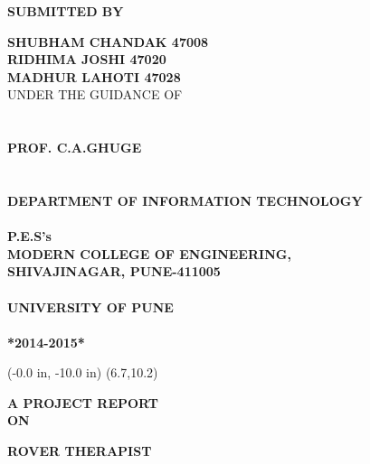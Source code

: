 \documentclass[12pt,a4paper]{article}
\begin{document}
	\begin{center}
	   \textbf{SUBMITTED BY}
	\end{center}
	\vspace{0.1 in}
	\begin{center}
	\textbf{SHUBHAM CHANDAK  47008}\\
	\textbf{RIDHIMA JOSHI  47020}\\	
	\textbf{MADHUR LAHOTI  47028}\\
	
	 \vspace{0.2 in}
	    UNDER THE GUIDANCE OF \\
	    \\
	    \\
	    \textbf{PROF. C.A.GHUGE}\\
	    \\
	    \\
	    \textbf{DEPARTMENT OF INFORMATION TECHNOLOGY}\\
	    \\
	    \textbf{P.E.S's}\\
	    \textbf{MODERN COLLEGE OF ENGINEERING,}\\
	    \textbf{SHIVAJINAGAR, PUNE-411005}\\
	    \\
	    \textbf{UNIVERSITY OF PUNE}\\
	    \\
	    \textbf{*2014-2015*}\\
	     \end{center}

\newpage
\pagestyle{empty}
	\thisfancyput(-0.0 in, -10.0 in) {\setlength{\unitlength}{1 in}\framebox(6.7,10.2)}
\begin{center}
      
      \textbf{A PROJECT REPORT}\\
      \textbf{ON}
      \vspace{0.2 in}
       
			\end{center}
\vspace{0.1 in}
	\begin{center}
		\textbf{ROVER THERAPIST}\\
	\end{center}
     
\end{document}
